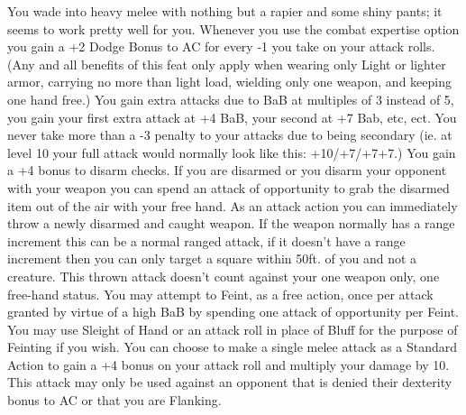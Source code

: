 \begin{multicols}{2}
\label{comm:feat:duelist}{}
{You wade into heavy melee with nothing but a rapier and some shiny pants; it seems to work pretty well for you.
}{Whenever you use the combat expertise option you gain a +2 Dodge Bonus to AC for every -1 you take on your attack rolls.(Any and all benefits of this feat only apply when wearing only Light or lighter armor, carrying no more than light load, wielding only one weapon, and keeping one hand free.)
}{You gain extra attacks due to BaB at multiples of 3 instead of 5, you gain your first extra attack at +4 BaB, your second at +7 Bab, etc, ect. You never take more than a -3 penalty to your attacks due to being secondary (ie. at level 10 your full attack would normally look like this: +10/+7/+7+7.)
}{You gain a +4 bonus to disarm checks. If you are disarmed or you disarm your opponent with your weapon you can spend an attack of opportunity to grab the disarmed item out of the air with your free hand. As an attack action you can immediately throw a newly disarmed and caught weapon. If the weapon normally has a range increment this can be a normal ranged attack, if it doesn't have a range increment then you can only target a square within 50ft. of you and not a creature. This thrown attack doesn't count against your one weapon only, one free-hand status.
}{You may attempt to Feint, as a free action, once per attack granted by virtue of a high BaB by spending one attack of opportunity per Feint. You may use Sleight of Hand or an attack roll in place of Bluff for the purpose of Feinting if you wish.
}{You can choose to make a single melee attack as a Standard Action to gain a +4 bonus on your attack roll and multiply your damage by 10. This attack may only be used against an opponent that is denied their dexterity bonus to AC or that you are Flanking.}


\end{multicols}
